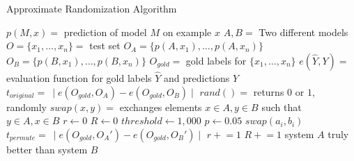 \begin{algorithm}
\caption{Approximate Randomization Algorithm}
\label{alg:approximate-randomization}
	\begin{algorithmic}[1]
    \STATE $p(M,x) =$ prediction of model $M$ on example $x$
    \STATE $A, B =$ Two different models
    \STATE $O = \{x_1, \dotsc, x_n\} =$ test set
    \STATE $O_A = \{p(A,x_1), \dotsc, p(A,x_n)\}$
    \STATE $O_B = \{p(B,x_1), \dotsc, p(B,x_n)\}$
    \STATE $O_{gold} =$ gold labels for $\{x_1, \dotsc, x_n\}$
    \STATE $e(\hat{Y},Y) =$ evaluation function for gold labels $\hat{Y}$ and predictions $Y$
    \STATE $t_{original} =\ \mid e(O_{gold},O_A) - e(O_{gold},O_B) \mid$
    \STATE $rand() =$ returns $0$ or $1$, randomly
    \STATE $swap(x,y) =$ exchanges elements $x \in A,y \in B$ such that $y \in A, x \in B$
    \STATE $r \leftarrow 0$
    \STATE $R \leftarrow 0$
    \STATE $threshold \leftarrow 1,000$
    \STATE $p \leftarrow 0.05$
          \STATE $swap(a_i,b_i)$
        \ENDIF
      \ENDFOR
      \STATE $t_{permute} =\ \mid e(O_{gold},O_A') - e(O_{gold},O_B') \mid$
        \STATE $r \mathrel{+}= 1$
      \ENDIF
      \STATE $R \mathrel{+}= 1$
    \ENDWHILE
      \STATE system $A$ truly better than system $B$
    \ENDIF
  \end{algorithmic}
\end{algorithm}





